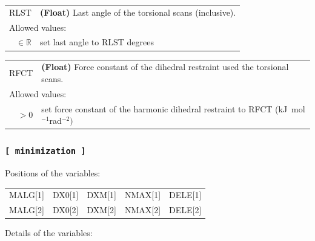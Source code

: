 \documentclass[10pt,a4paper,openany]{memoir}
\numberwithin{equation}{section}
\begin{document}
{
\begin{tabular}{r@{ : }l}
\label{descr:rlst}
      RLST&\textbf{(Float)} Last angle of the torsional scans (inclusive).                                                        \\ 
\multicolumn{2}{l}{Allowed values:} \\ 
\(\in\mathbb{R}\)&set last angle to RLST degrees                                                                       \\ 
\end{tabular}
\vspace{1ex}
}

{
\begin{tabular}{r@{ : }l}
\label{descr:rfct}
      RFCT&\textbf{(Float)} Force constant of the dihedral restraint used the torsional scans.                                      \\ 
\multicolumn{2}{l}{Allowed values:} \\ 
    \(>0\)&set force constant of the harmonic dihedral restraint to RFCT (kJ~mol$^{-1}$rad$^{-2})$        \\ 
\end{tabular}
\vspace{1ex}
}

\subsubsection{\texttt{[~minimization~]}}
\label{sec:inp-minimization}


\noindent Positions of the variables:
\begin{center}
  \begin{tabular}{lllll}
    MALG[1] & DX0[1] & DXM[1] & NMAX[1] & DELE[1] \\
    MALG[2] & DX0[2] & DXM[2] & NMAX[2] & DELE[2] \\
  \end{tabular}
\end{center}

\noindent Details of the variables:
\vspace{2ex}
\end{document}
